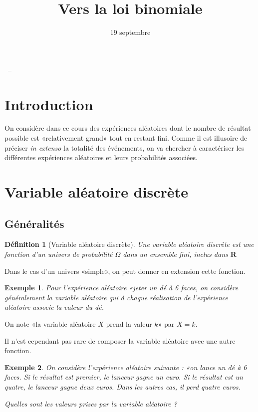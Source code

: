 \documentclass[a4ppaer,12pt,french]{article}
\title{Vers la loi binomiale}
\author{\bsc{Jumel}}
\date{19 septembre}
\makeatletter
\renewcommand{\maketitle}{%
  \begin{mdframed}\begin{center}\Large \@title ~-- \@author \\ \@date
  \normalsize \end{center} \end{mdframed}
}
\newcommand{\R}{\mathbf{R}}
\newtheorem{definition}{Définition}
\newtheorem{exemple}{Exemple}
\makeatother
\begin{document}
\maketitle

\section*{Introduction}

On considère dans ce cours des expériences aléatoires dont le nombre de
résultat possible est «relativement grand» tout en restant fini. Comme
il est illusoire de préciser \emph{in extenso} la totalité des
événements, on va chercher à caractériser les différentes expériences
aléatoires et leurs probabilités associées.

\section{Variable aléatoire discrète}

\subsection{Généralités}

\begin{definition}[Variable aléatoire discrète]
  Une variable aléatoire discrète est une \emph{fonction} d'un univers de
  probabilité $\Omega$ dans un ensemble fini, inclus dans $\R$
\end{definition}

Dans le cas d'un univers «simple», on peut donner en extension cette
fonction.
\begin{exemple}
  Pour l'expérience aléatoire «jeter un dé à 6 faces, on considère
  généralement la variable aléatoire qui à chaque réalisation de
  l'expérience aléatoire associe la valeur du dé.
\end{exemple}

On note «la variable aléatoire $X$ prend la valeur $k$» par $X = k$.

Il n'est cependant pas rare de composer la variable aléatoire avec une
autre fonction.

\begin{mdframed}
  \begin{exemple}
    On considère l'expérience aléatoire suivante : «on lance un dé à 6
    faces. Si le résultat est premier, le lanceur gagne un euro. Si le
    résultat est un quatre, le lanceur gagne deux euros. Dans les autres
    cas, il perd quatre euros.

    \emph{Quelles sont les valeurs prises par la variable aléatoire ?}
    \\[1.6cm]
  \end{exemple}
\end{mdframed}
\end{document}
